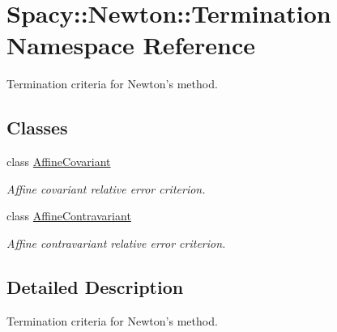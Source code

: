 \hypertarget{namespaceSpacy_1_1Newton_1_1Termination}{\section{\-Spacy\-:\-:\-Newton\-:\-:\-Termination \-Namespace \-Reference}
\label{namespaceSpacy_1_1Newton_1_1Termination}
}


\-Termination criteria for \-Newton's method.  


\subsection*{\-Classes}
\begin{DoxyCompactItemize}
\item 
class \hyperlink{classSpacy_1_1Newton_1_1Termination_1_1AffineCovariant}{\-Affine\-Covariant}
\begin{DoxyCompactList}\small\item\em \-Affine covariant relative error criterion. \end{DoxyCompactList}\item 
class \hyperlink{classSpacy_1_1Newton_1_1Termination_1_1AffineContravariant}{\-Affine\-Contravariant}
\begin{DoxyCompactList}\small\item\em \-Affine contravariant relative error criterion. \end{DoxyCompactList}\end{DoxyCompactItemize}


\subsection{\-Detailed \-Description}
\-Termination criteria for \-Newton's method. 